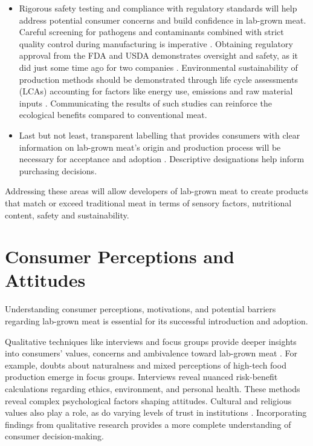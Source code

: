 \documentclass[10pt]{article}
\begin{document}
\begin{sloppypar}
\begin{itemize}
    \item Rigorous safety testing and compliance with regulatory standards will help address potential consumer concerns and build confidence in lab-grown meat. Careful screening for pathogens and contaminants combined with strict quality control during manufacturing is imperative \citep{ong_food_2021}. Obtaining regulatory approval from the FDA and USDA demonstrates oversight and safety, as it did just some time ago for two companies \citep{mccarthy_usda_nodate}. Environmental sustainability of production methods should be demonstrated through life cycle assessments (LCAs) accounting for factors like energy use, emissions and raw material inputs \citep{mattick_anticipatory_2015}. Communicating the results of such studies can reinforce the ecological benefits compared to conventional meat.

    \item Last but not least, transparent labelling that provides consumers with clear information on lab-grown meat’s origin and production process will be necessary for acceptance and adoption \citep{failla_evaluation_2023}. Descriptive designations help inform purchasing decisions.
  \end{itemize}
  Addressing these areas will allow developers of lab-grown meat to create products that match or exceed traditional meat in terms of sensory factors, nutritional content, safety and sustainability.

  \section{Consumer Perceptions and Attitudes}
  \label{sec:consumer-perceptions-and-attitudes}

  Understanding consumer perceptions, motivations, and potential barriers regarding lab-grown meat is essential for its successful introduction and adoption.

  Qualitative techniques like interviews and focus groups provide deeper insights into consumers’ values, concerns and ambivalence toward lab-grown meat \citep{laestadius_is_2015}. For example, doubts about naturalness and mixed perceptions of high-tech food production emerge in focus groups. Interviews reveal nuanced risk-benefit calculations regarding ethics, environment, and personal health. These methods reveal complex psychological factors shaping attitudes. Cultural and religious values also play a role, as do varying levels of trust in institutions \citep{al-kwifi_dynamics_2019}. Incorporating findings from qualitative research provides a more complete understanding of consumer decision-making.


\end{sloppypar}
\end{document}
